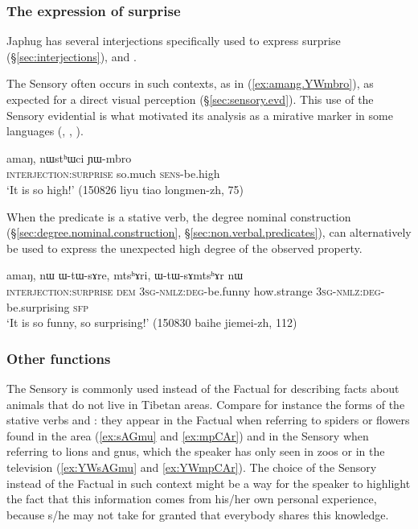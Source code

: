 \subsubsection{The expression of surprise} \label{sec:mirative}
Japhug has several interjections specifically used to express surprise (§\ref{sec:interjections}),  and . 

The Sensory often occurs in such contexts, as in (\ref{ex:amang.YWmbro}), as expected for a direct visual perception (§\ref{sec:sensory.evd}). This use of the Sensory evidential is what motivated its analysis as a mirative marker in some languages (\citealt{hill12mirativity}, \citealt{delancey12still}, \citealt{aikhenvald12mirativity}).

\begin{exe}
\ex \label{ex:amang.YWmbro}
 \gll amaŋ, nɯstʰɯci ɲɯ-mbro \\
 \textsc{interjection}:\textsc{surprise} so.much \textsc{sens}-be.high \\
 \glt `It is so high!' (150826 liyu tiao longmen-zh, 75)
\end{exe}

When the predicate is a stative verb, the degree nominal construction (§\ref{sec:degree.nominal.construction}, §\ref{sec:non.verbal.predicates}), can alternatively be used to express the unexpected high degree of the observed property.

\begin{exe}
\ex \label{ex:amang.WtWsAre}
 \gll amaŋ, nɯ ɯ-tɯ-sɤre, mtsʰɤri, ɯ-tɯ-sɤmtsʰɤr nɯ \\
 \textsc{interjection}:\textsc{surprise} \textsc{dem} \textsc{3sg}-\textsc{nmlz}:\textsc{deg}-be.funny  how.strange \textsc{3sg}-\textsc{nmlz}:\textsc{deg}-be.surprising \textsc{sfp} \\
 \glt `It is so funny, so surprising!' (150830 baihe jiemei-zh, 112)
\end{exe}



\subsubsection{Other functions} \label{sec:sensory.other}
The Sensory is commonly used instead of the Factual for describing facts about animals that do not live in Tibetan areas. Compare for instance the forms of the stative verbs  and : they appear in the Factual when referring to spiders or flowers found in the area (\ref{ex:sAGmu} and \ref{ex:mpCAr}) and in the Sensory when referring to lions and gnus, which the speaker has only seen in zoos or in the television  (\ref{ex:YWsAGmu} and \ref{ex:YWmpCAr}). The choice of the Sensory instead of the Factual in such context might be a way for the speaker to highlight the fact that this information comes from his/her own personal experience, because s/he may not take for granted that everybody shares this knowledge.

